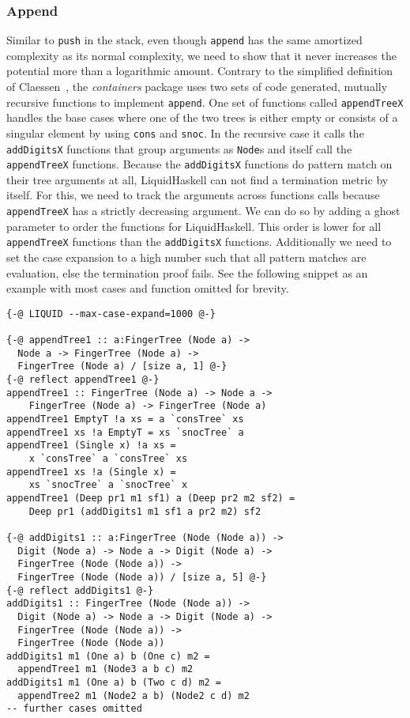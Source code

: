 \documentclass[sigplan,screen]{acmart}
\begin{document}
\subsubsection{Append}\label{sec:append}

Similar to \texttt{push} in the stack, even though \texttt{append} has the same amortized complexity as its normal complexity, we need to show that it never increases the potential more than a logarithmic amount. Contrary to the simplified definition of Claessen~\cite{fingertrees_new}, the \textit{containers} package uses two sets of code generated, mutually recursive functions to implement \texttt{append}. One set of functions called \texttt{appendTreeX} handles the base cases where one of the two trees is either empty or consists of a singular element by using \texttt{cons} and \texttt{snoc}. In the recursive case it calls the \texttt{addDigitsX} functions that group arguments as \texttt{Node}s and itself call the \texttt{appendTreeX} functions. Because the \texttt{addDigitsX} functions do pattern match on their tree arguments at all, LiquidHaskell can not find a termination metric by itself. For this, we need to track the arguments across functions calls because \texttt{appendTreeX} has a strictly decreasing argument. We can do so by adding a ghost parameter to order the functions for LiquidHaskell. This order is lower for all \texttt{appendTreeX} functions than the \texttt{addDigitsX} functions. Additionally we need to set the case expansion to a high number such that all pattern matches are evaluation, else the termination proof fails. See the following snippet as an example with most cases and function omitted for brevity.

\begin{lstlisting}
{-@ LIQUID --max-case-expand=1000 @-}

{-@ appendTree1 :: a:FingerTree (Node a) ->
  Node a -> FingerTree (Node a) ->
  FingerTree (Node a) / [size a, 1] @-}
{-@ reflect appendTree1 @-}
appendTree1 :: FingerTree (Node a) -> Node a ->
    FingerTree (Node a) -> FingerTree (Node a)
appendTree1 EmptyT !a xs = a `consTree` xs
appendTree1 xs !a EmptyT = xs `snocTree` a
appendTree1 (Single x) !a xs =
    x `consTree` a `consTree` xs
appendTree1 xs !a (Single x) =
    xs `snocTree` a `snocTree` x
appendTree1 (Deep pr1 m1 sf1) a (Deep pr2 m2 sf2) =
    Deep pr1 (addDigits1 m1 sf1 a pr2 m2) sf2

{-@ addDigits1 :: a:FingerTree (Node (Node a)) ->
  Digit (Node a) -> Node a -> Digit (Node a) ->
  FingerTree (Node (Node a)) ->
  FingerTree (Node (Node a)) / [size a, 5] @-}
{-@ reflect addDigits1 @-}
addDigits1 :: FingerTree (Node (Node a)) ->
  Digit (Node a) -> Node a -> Digit (Node a) ->
  FingerTree (Node (Node a)) ->
  FingerTree (Node (Node a))
addDigits1 m1 (One a) b (One c) m2 =
  appendTree1 m1 (Node3 a b c) m2
addDigits1 m1 (One a) b (Two c d) m2 =
  appendTree2 m1 (Node2 a b) (Node2 c d) m2
-- further cases omitted
\end{lstlisting}
\end{document}
